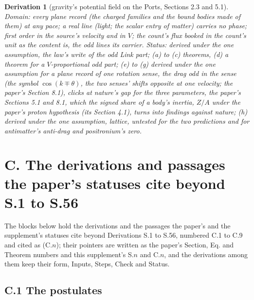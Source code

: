 \documentclass[pdflatex,sn-mathphys-num]{sn-jnl}
\theoremstyle{thmstyleone}
\newtheorem{derivation}{Derivation}
\begin{document}
\begin{derivation}[gravity's potential field on the Ports, Sections 2.3 and 5.1]
\emph{Domain:} every plane record (the charged families and the bound bodies made of them) at any pace; a real line (light; the scalar entry of matter) carries no phase; first order in the source's velocity and in $V$; the count's flux booked in the count's unit as the content is, the odd lines its carrier. \emph{Status:} derived under the one assumption, the law's write of the odd Link part; (a) to (c) theorems, (d) a theorem for a $V$-proportional odd part; (e) to (g) derived under the one assumption for a plane record of one rotation sense, the drag odd in the sense (the symbol $\cos(k \mp \theta)$, the two senses' shifts opposite at one velocity; the paper's Section 8.1), clicks at nature's gap for the three parameters, the paper's Sections 5.1 and 8.1, which the signed share of a body's inertia, $Z / A$ under the paper's proton hypothesis (its Section 4.1), turns into findings against nature; (h) derived under the one assumption, lattice, untested for the two predictions and for antimatter's anti-drag and positronium's zero.
\end{derivation}


\section*{C. The derivations and passages the paper's statuses cite beyond S.1 to S.56}\label{sec:carried}

\noindent The blocks below hold the derivations and the passages the paper's and the supplement's statuses cite beyond Derivations S.1 to S.56, numbered C.1 to C.9 and cited as (C.$n$); their pointers are written as the paper's Section, Eq. and Theorem numbers and this supplement's S.$n$ and C.$n$, and the derivations among them keep their form, Inputs, Steps, Check and Status.

\subsection*{C.1 The postulates}
\end{document}
